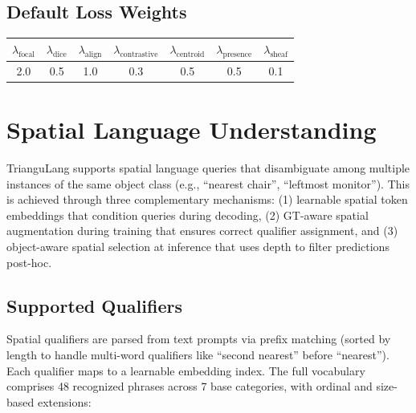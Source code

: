 \subsection{Default Loss Weights}

\begin{center}
\small
\begin{tabular}{@{}ccccccc@{}}
$\lambda_{\text{focal}}$ & $\lambda_{\text{dice}}$ & $\lambda_{\text{align}}$ & $\lambda_{\text{contrastive}}$ & $\lambda_{\text{centroid}}$ & $\lambda_{\text{presence}}$ & $\lambda_{\text{sheaf}}$ \\
\midrule
2.0 & 0.5 & 1.0 & 0.3 & 0.5 & 0.5 & 0.1 \\
\end{tabular}
\end{center}

\section{Spatial Language Understanding}
\label{app:spatial}

TrianguLang supports spatial language queries that disambiguate among multiple instances of the same object class (e.g., ``nearest chair'', ``leftmost monitor''). This is achieved through three complementary mechanisms: (1) learnable spatial token embeddings that condition queries during decoding, (2) GT-aware spatial augmentation during training that ensures correct qualifier assignment, and (3) object-aware spatial selection at inference that uses depth to filter predictions post-hoc.

\subsection{Supported Qualifiers}

Spatial qualifiers are parsed from text prompts via prefix matching (sorted by length to handle multi-word qualifiers like ``second nearest'' before ``nearest''). Each qualifier maps to a learnable embedding index. The full vocabulary comprises 48 recognized phrases across 7 base categories, with ordinal and size-based extensions:


